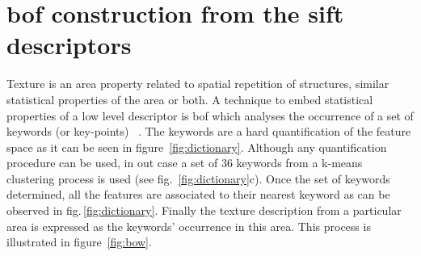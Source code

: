 \documentclass[a4paper, 10pt, conference]{llncs}      %
\begin{document}
\section{\acf{bof} construction from the \ac{sift} descriptors}
Texture is an area property related to spatial repetition of structures, similar statistical properties of the area or both. A technique to embed statistical properties of a low level descriptor is \ac{bof} which analyses the occurrence of a set of keywords (or key-points) ~\cite{csurka2004visual}. The keywords are a hard quantification of the feature space as it can be seen in figure~\ref{fig:dictionary}. Although any quantification procedure can be used, in out case a set of 36 keywords from a k-means clustering process is used (see fig.~\ref{fig:dictionary}c). Once the set of keywords determined, all the features are associated to their nearest keyword as can be observed in fig.\,\ref{fig:dictionary}. Finally the texture description from a particular area is expressed as the keywords' occurrence in this area. This process is illustrated in figure~\ref{fig:bow}.
\end{document}
